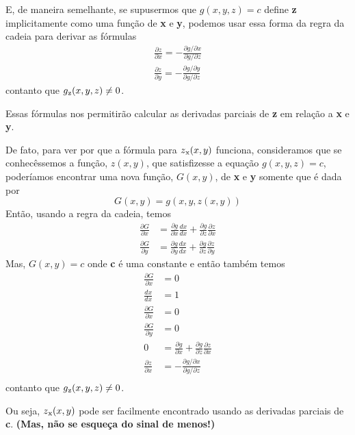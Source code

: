 \documentclass[a4paper]{article}
\begin{document}
\par E, de maneira semelhante, se supusermos que $g(x,y,z) = c$ define \textbf{z} implicitamente como uma função de \textbf{x} e \textbf{y}, podemos usar essa forma da regra da cadeia para derivar as fórmulas
\begin{equation}
    \begin{split}
        \frac{\partial z}{\partial x} = - \frac{\partial g/\partial x}{\partial g/\partial z} \\
        \frac{\partial z}{\partial y} = - \frac{\partial g/\partial y}{\partial g/\partial z}
    \end{split}
\end{equation}
contanto que $g\textsubscript{z}(x,y,z) \neq 0$.
\par Essas fórmulas nos permitirão calcular as derivadas parciais de \textbf{z} em relação a \textbf{x} e \textbf{y}.
\par De fato, para ver por que a fórmula para $z\textsubscript{x}(x,y)$ funciona, consideramos que se conhecêssemos a função, $z(x,y)$, que satisfizesse a equação $g(x,y,z) = c$, poderíamos encontrar uma nova função, $G(x,y)$, de \textbf{x} e \textbf{y} somente que é dada por
\begin{equation}
    G(x,y) = g(x,y,z(x,y))
\end{equation}
Então, usando a regra da cadeia, temos
\begin{equation}
    \begin{split}
        \frac{\partial G}{\partial x} & = \frac{\partial g}{\partial x} \frac{dx}{dx} + \frac{\partial g}{\partial z}\frac{\partial z}{\partial x}\\
        \frac{\partial G}{\partial y} & = \frac{\partial g}{\partial y} \frac{dx}{dx} + \frac{\partial g}{\partial z}\frac{\partial z}{\partial y}
    \end{split}
\end{equation}
Mas, $G(x,y) = c$ onde \textbf{c} é uma constante e então também temos
\begin{equation}
    \begin{split}
        \frac{\partial G}{\partial x} & = 0\\
        \frac{dx}{dx} & = 1 \\
        \frac{\partial G}{\partial x} & = 0\\
        \frac{\partial G}{\partial y} & = 0\\
        0 &= \frac{\partial g}{\partial x} + \frac{\partial g}{\partial z}\frac{\partial z}{\partial x}\\
        \frac{\partial z}{\partial x} & = - \frac{\partial g/\partial x}{\partial g/\partial z} \\
    \end{split}
\end{equation}
contanto que $g\textsubscript{z}(x,y,z) \neq 0$.
\par Ou seja, $z\textsubscript{x}(x,y)$ pode ser facilmente encontrado usando as derivadas parciais de \textbf{c}. \textbf{(Mas, não se esqueça do sinal de menos!)}
\end{document}
